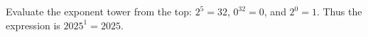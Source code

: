 Evaluate the exponent tower from the top: $2^5=32$, $0^{32}=0$, and $2^0=1$. Thus the expression is $2025^1=\boxed{2025}$.
